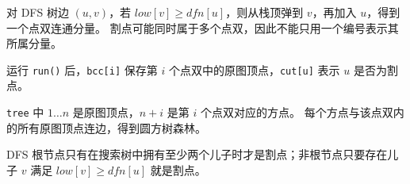 对 DFS 树边 \((u,v)\)，若 \(low[v]\ge dfn[u]\)，则从栈顶弹到 \(v\)，再加入 \(u\)，得到一个点双连通分量。
割点可能同时属于多个点双，因此不能只用一个编号表示其所属分量。

运行 \texttt{run()} 后，\texttt{bcc[i]} 保存第 \(i\) 个点双中的原图顶点，\texttt{cut[u]} 表示 \(u\) 是否为割点。

\begin{icpcresult}[圆方树编号]
  \texttt{tree} 中 \(1\ldots n\) 是原图顶点，\(n+i\) 是第 \(i\) 个点双对应的方点。
  每个方点与该点双内的所有原图顶点连边，得到圆方树森林。
\end{icpcresult}

\begin{icpcwarning}[根节点判定]
  DFS 根节点只有在搜索树中拥有至少两个儿子时才是割点；非根节点只要存在儿子 \(v\) 满足 \(low[v]\ge dfn[u]\) 就是割点。
\end{icpcwarning}
